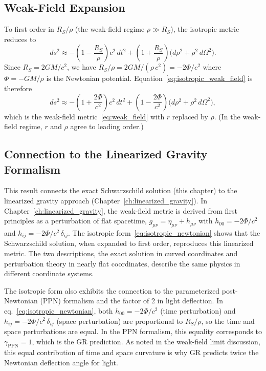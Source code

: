\subsection{Weak-Field Expansion}

To first order in $R_S/\rho$ (the weak-field regime $\rho \gg R_S$),
the isotropic metric reduces to
\begin{equation}
    ds^2 \approx -\left(1 - \frac{R_S}{\rho}\right) c^2\, dt^2
    + \left(1 + \frac{R_S}{\rho}\right)
    \bigl(d\rho^2 + \rho^2\, d\Omega^2\bigr) .
    \label{eq:isotropic_weak_field}
\end{equation}
Since $R_S = 2GM/c^2$, we have $R_S/\rho = 2GM/(\rho\, c^2) =
-2\Phi/c^2$ where $\Phi = -GM/\rho$ is the Newtonian potential.
Equation~\eqref{eq:isotropic_weak_field} is therefore
\begin{equation}
    ds^2 \approx -\left(1 + \frac{2\Phi}{c^2}\right) c^2\, dt^2
    + \left(1 - \frac{2\Phi}{c^2}\right)
    \bigl(d\rho^2 + \rho^2\, d\Omega^2\bigr) ,
    \label{eq:isotropic_newtonian}
\end{equation}
which is the weak-field metric~\eqref{eq:weak_field} with
$r$ replaced by $\rho$.  (In the weak-field regime, $r$ and $\rho$
agree to leading order.)

\subsection{Connection to the Linearized Gravity Formalism}

This result connects the exact
Schwarzschild solution (this chapter) to the linearized gravity
approach (Chapter~\ref{ch:linearized_gravity}).  In Chapter~\ref{ch:linearized_gravity}, the weak-field metric is derived
from first principles as a perturbation of flat spacetime,
$g_{\mu\nu} = \eta_{\mu\nu} + h_{\mu\nu}$ with
$h_{00} = -2\Phi/c^2$ and $h_{ij} = -2\Phi/c^2\,\delta_{ij}$.
The isotropic form~\eqref{eq:isotropic_newtonian} shows that the
Schwarzschild solution, when expanded to first order, reproduces
this linearized metric.  The two descriptions, the exact
solution in curved coordinates and perturbation theory in nearly
flat coordinates, describe the same physics in different
coordinate systems.

\begin{remark}
The isotropic form also exhibits the connection to the parameterized
post-Newtonian (PPN) formalism and the factor of 2 in light
deflection.  In eq.~\eqref{eq:isotropic_newtonian}, both
$h_{00} = -2\Phi/c^2$ (time perturbation) and
$h_{ij} = -2\Phi/c^2\,\delta_{ij}$ (space perturbation) are
proportional to $R_S/\rho$, so the time and space
perturbations are equal.  In the PPN formalism, this
equality corresponds to $\gamma_{\mathrm{PPN}} = 1$, which is the GR
prediction.  As noted in the weak-field limit discussion, this equal
contribution of time and space curvature is why GR predicts
twice the Newtonian deflection angle for light.
\end{remark}


